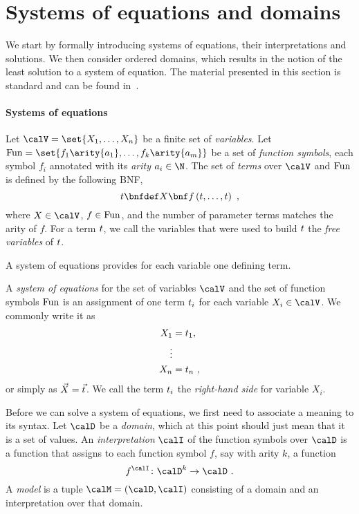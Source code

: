 \documentclass[../../diss.tex]{subfiles}
\begin{document}
\section{Systems of equations and domains}%
\label{Section:EDSEqSys}%

We start by formally introducing systems of equations, their interpretations and solutions.
We then consider ordered domains, which results in the notion of the least solution to a system of equation.
The material presented in this section is standard and can be found \eg in~\cite{NielsonNH99}.

\paragraph{Systems of equations}

Let $\vars = \set{X_1, \ldots, X_n}$ be a finite set of \emph{variables}.
Let $\funs = \set{f_1\arity{a_1}, \ldots, f_k\arity{a_m}}$ be a set of \emph{function symbols}, each symbol $f_i$ annotated with its \emph{arity} $a_i \in \N$.
The set of \emph{terms} over $\vars$ and $\text{Fun}$ is defined by the following BNF,\@
\[
    \term \bnfdef X \bnf f \left( \term, \ldots, \term \right)
    \ ,
\]
where $X \in \vars$, $f \in \text{Fun}$, and the number of parameter terms matches the arity of $f$.
For a term $t$, we call the variables that were used to build $t$ the \emph{free variables} of $t$.


A system of equations provides for each variable one defining term.

\begin{definition}
    A \emph{system of equations} for the set of variables $\vars$ and the set of function symbols $\text{Fun}$ is an assignment of one term $t_i$ for each variable $X_i \in \vars$.
    We commonly write it as
    \begin{align*}
        X_1 &= t_1,
        \\
        \vdots
        \\
        X_n &= t_n
        \ ,
    \end{align*}
    or simply as $\vec{X} = \vec{t}$.
    We call the term $t_i$ the \emph{right-hand side} for variable $X_i$.
\end{definition}

Before we can solve a system of equations, we first need to associate a meaning to its syntax.
Let $\domain$ be a \emph{domain}, which at this point should just mean that it is a set of values.
An \emph{interpretation} $\interpretation$ of the function symbols over $\domain$ is a function that assigns to each function symbol $f$, say with arity $k$, a function
\[
    f^\interpretation \colon \domain^k \to \domain
    \ .
\]
A \emph{model} is a tuple $\model = (\domain,\interpretation)$ consisting of a domain and an interpretation over that domain.
\end{document}
